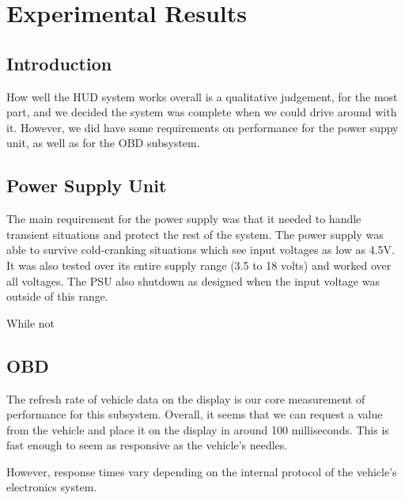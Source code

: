 \chapter{Experimental Results}


\section{Introduction}

How well the HUD system works overall is a qualitative judgement, for the most
part, and we decided the system was complete when we could drive around with it.
However, we did have some requirements on performance for the power suppy unit, as well
as for the OBD subsystem.

\section{Power Supply Unit}

The main requirement for the power supply was that it needed to handle transient 
situations and protect the rest of the system.  The power supply was able to survive
cold-cranking situations which see input voltages as low as 4.5V.  It was also tested
over its entire supply range (3.5 to 18 volts) and worked over all voltages.  The PSU
also shutdown as designed when the input voltage was outside of this range.

While not 

\section{OBD}

The refresh rate of vehicle data on the display is our core measurement of
performance for this subsystem. Overall, it seems that we can request a value
from the vehicle and place it on the display in around 100 milliseconds. This
is fast enough to seem as responsive as the vehicle's needles.

However, response times vary depending on the internal protocol of the vehicle's
electronics system.
